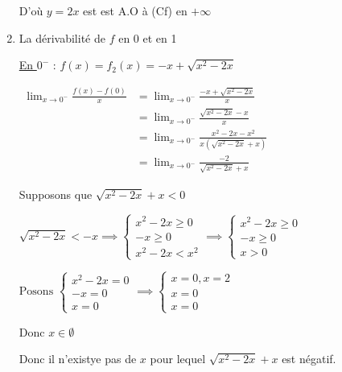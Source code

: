 \documentclass[12pt,a4paper]{article}
\begin{document}
\begin{enumerate}
D'où $ y=2x $ est  est A.O à (Cf) en $ +\infty $
\item La dérivabilité de $f$ en 0 et en 1

\underline{En \( 0^{-} \)} : \( f(x) = f_{2}(x) = -x + \sqrt{x^2 - 2x} \) 

$
\begin{aligned}
\lim_{x \to 0^{-}} \frac{f(x)-f(0)}{x} &= \lim_{x \to 0^{-}} \frac{-x + \sqrt{x^2 - 2x}}{x}\\
																					&= \lim_{x \to 0^{-}} \frac{\sqrt{x^2 - 2x} - x }{x}\\
																				 &= \lim_{x \to 0^{-}} \frac{x^{2} - 2x - x^{2}}{x(\sqrt{x^2 - 2x}+x)}\\
																				 &= \lim_{x \to 0^{-}} \frac{ - 2}{\sqrt{x^2 - 2x}+x}
\end{aligned}
$

Supposons que $ \sqrt{x^2 - 2x}+x < 0 $

$
\sqrt{x^2 - 2x} < -x \implies
\begin{cases}
x^2 - 2x \geq 0 \\
-x \geq 0 \\
x^2 - 2x < x^{2}
\end{cases}
\implies
\begin{cases}
x^2 - 2x \geq 0 \\
-x \geq 0 \\
x > 0
\end{cases}
$

$
\text{Posons }
\begin{cases}
x^2 - 2x = 0 \\
-x = 0 \\
x = 0
\end{cases}
\implies
\begin{cases}
x = 0, x = 2 \\
x = 0 \\
x = 0
\end{cases}
$


Donc $x \in \emptyset $ 

Donc il n'existye pas de $x$ pour lequel $\sqrt{x^2 - 2x}+x$ est négatif. 


\end{enumerate}
\end{document}
